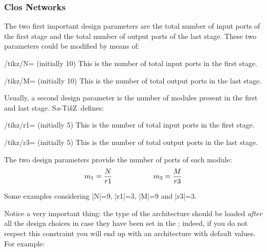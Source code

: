 \documentclass{ltxdoc} %
\newcommand\Tikz{Ti\textit kZ}
\newcommand{\saTikZ}{\textsc S\textit a-\Tikz}
\begin{document}
\subsubsection{Clos Networks}
\label{subsubsec:clos}
The two first important design parameters are the total number of input ports of the first stage and the total number of output ports of the last stage. These two parameters could be modified by means of:

\begin{key}{/tikz/N= (initially 10)}
    This is the number of total input ports in the first stage.
\end{key}

\begin{key}{/tikz/M= (initially 10)}
    This is the number of total output ports in the last stage.
\end{key}

Usually, a second design parameter is the number of modules present in the first and last stage. \saTikZ\ defines:

\begin{key}{/tikz/r1= (initially 5)}
    This is the number of total input ports in the first stage.
\end{key}

\begin{key}{/tikz/r3= (initially 5)}
    This is the number of total output ports in the last stage.
\end{key}

The two design parameters provide the number of ports of each module:
\[m_1=\dfrac{N}{r1} \hspace*{2cm} m_3=\dfrac{M}{r3} \]

Some examples considering |N|=9, |r1|=3, |M|=9 and |r3|=3.
\begin{codeexample}[]
\begin{tikzpicture}
    \node[N=9,r1=3,M=9,r3=3,clos rear] {};
\end{tikzpicture}
\end{codeexample}

\begin{codeexample}[]
\begin{tikzpicture}
    \node[N=9,r1=3,M=9,r3=3,clos snb] {};
\end{tikzpicture}
\end{codeexample}

Notice a very important thing: the type of the architecture should be loaded \emph{after} all the design choices in case they have been set in the ; indeed, if you do not respect this constraint you will end up with an architecture with default values. For example:
\end{document}
